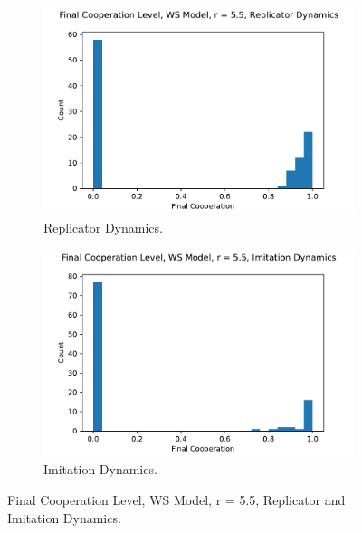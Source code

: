 \FloatBarrier 
\begin{figure}[!h]
  \begin{subfigure}[b]{0.45\textwidth}
    \includegraphics[width=1.1\textwidth]{images/Rep_coop_histo_WS_55.pdf}
    \caption{Replicator Dynamics. }
    \label{Rep_WS_55_coop_histo}
  \end{subfigure}
  \hfill
  \begin{subfigure}[b]{0.45\textwidth}
    \includegraphics[width=1.1\textwidth]{images/ID_coop_histo_WS_55.pdf}
    \caption{Imitation Dynamics. }
    \label{ID_WS_55_coop_histo}
  \end{subfigure}
  \caption{Final Cooperation Level, WS Model, r = 5.5, Replicator and Imitation Dynamics. } \label{coop_histo_WS}
\end{figure} 
\FloatBarrier

